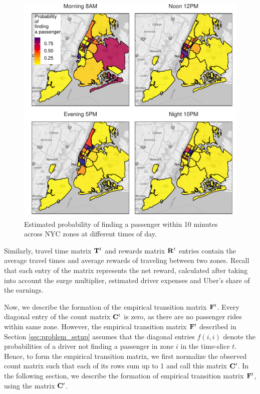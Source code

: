 \begin{figure}
	\centering
	\includegraphics{figures/successful_heatmap.pdf}
	\caption{Estimated probability of finding a passenger within 10 minutes across NYC zones at different times of day.}
	\label{fig:successful_heatmap}
\end{figure}

Similarly, travel time matrix ${\mathbf{T}}^t$ and rewards matrix ${\mathbf{R}}^t$ entries contain the average travel times and average rewards of traveling between two zones. Recall that each entry of the {\rewardsmatrix} matrix represents the net reward, calculated after taking into account the surge multiplier, estimated driver expenses and Uber's share of the earnings.



Now, we describe the formation of the empirical transition matrix ${\mathbf{F}}^t$. Every diagonal entry of the count matrix ${\mathbf{C}}^t$ is zero, as there are no passenger rides within same zone. However, the empirical transition matrix ${\mathbf{F}}^t$ described in Section \ref{sec:problem_setup} assumes that the diagonal entries $f(i,i)$ denote the probabilities of a driver not finding a passenger in zone $i$ in the time-slice $t$. Hence, to form the empirical transition matrix, we first normalize the observed count matrix such that each of its rows sum up to 1 and call this matrix ${\mathbf{C}}^\prime$. 
In the following section, we describe the formation of empirical transition matrix ${\mathbf{F}}^t$, using the matrix ${\mathbf{C}}^\prime$.

